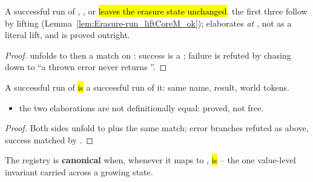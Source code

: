 \begin{lemma}
\label{lem:Erasure-run_getConstInfo_state}
\leanok
{}
 A successful run of , ,  or
 \hl{leaves the erasure state unchanged}.
 the first three follow by lifting (Lemma~\ref{lem:Erasure-run_liftCoreM_ok});
 elaborates \emph{at} , not as a literal lift, and is proved outright.
\end{lemma}
\begin{proof}
\leanok
{}
  unfolds to  then a match on
: success is a ; failure is refuted by chasing
 down to ``a thrown error never returns ''.
\end{proof}

\begin{lemma}
\label{lem:Erasure-pass_getConstInfo_core}
\leanok
{}
 A successful  run of  \hl{is} a successful
 run of it: same name, result, world tokens.
\begin{itemize}
\item {} the two elaborations are not definitionally equal: proved, not free.
\end{itemize}
\end{lemma}
\begin{proof}
\leanok
{}
 Both sides unfold to  plus the same match; error branches refuted as above,
success matched by .
\end{proof}

\begin{definition}
\label{def:Erasure-CanonicalConstants}
\leanok
{}
 The registry is \textbf{canonical} when, whenever it maps  to ,
\hl{ is } -- the one value-level invariant carried across a growing state.
\end{definition}

